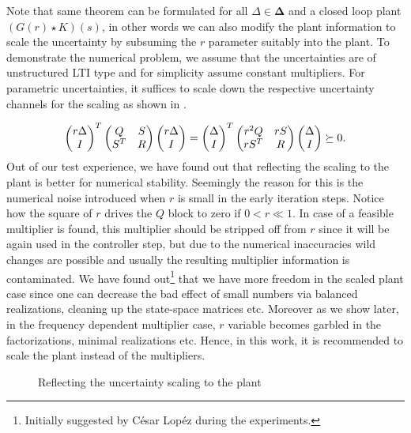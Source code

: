 \begin{rem}

Note that same theorem can be formulated for all $\Delta\in\bm{\Delta}$ and a closed loop plant $(G(r)\star K) (s)$,
in other words we can also modify the plant information to scale the uncertainty by subsuming the $r$ parameter suitably into the 
plant.
To demonstrate the numerical problem, we assume that the uncertainties are of unstructured LTI type and for simplicity assume constant multipliers. 
For parametric uncertainties, it suffices to scale down the respective uncertainty channels for the scaling as shown in . 

\[
\begin{pmatrix}r\Delta\\I\end{pmatrix}^T\begin{pmatrix}Q&S\\S^T&R\end{pmatrix}\begin{pmatrix}r\Delta\\I\end{pmatrix} = \begin{pmatrix}\Delta\\I\end{pmatrix}^T\begin{pmatrix}r^2 Q&rS\\rS^T&R\end{pmatrix}\begin{pmatrix}\Delta\\I\end{pmatrix}\succeq 0.
\]
Out of our test experience, we have found out that reflecting the scaling to the plant is better for numerical stability. Seemingly the reason for 
this is the numerical noise introduced when $r$ is small in the early iteration steps. Notice how the square of $r$ drives the $Q$ block to zero
if $0<r\ll 1$. In case of a feasible multiplier is found, this multiplier should be stripped off from $r$ since it will be again used in the 
controller step, but due to the numerical inaccuracies wild changes are possible and usually the resulting multiplier information is contaminated. 
We have found out\footnote{Initially suggested by C\'esar Lop\'ez during the experiments.} that we have more freedom in the scaled plant case since
one can decrease the bad effect of small numbers via balanced realizations, cleaning up the state-space matrices etc. Moreover as we show later,
in the frequency dependent multiplier case, $r$ variable becomes garbled in the factorizations, minimal realizations etc. Hence, in this work, it 
is recommended to scale the plant instead of the multipliers.
\end{rem}

\begin{figure}%
\centering%
\caption{Reflecting the uncertainty scaling to the plant}%
\label{fig:uncscale}%
\end{figure}



